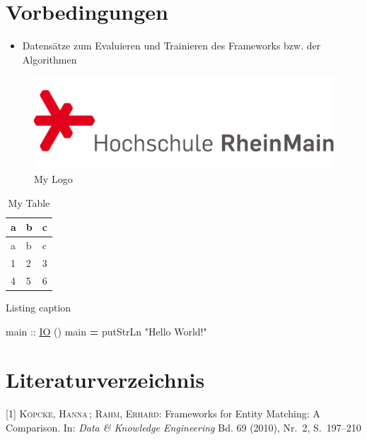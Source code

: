 \documentclass[%
	paper=A4,					%
	twoside=true,				%
	openright,					%
	parskip=full,				%
	chapterprefix=true,			%
	11pt,						%
	headings=normal,			%
	bibliography=totoc,			%
	listof=totoc,				%
	titlepage=on,				%
	captions=tableabove,		%
	draft=false,				%
]{scrreprt}%
\newenvironment{Shaded}{\begin{snugshade}}{\end{snugshade}}
\newcommand{\DataTypeTok}[1]{\textcolor[rgb]{0.74,0.68,0.62}{\underline{{#1}}}}
\newcommand{\StringTok}[1]{\textcolor[rgb]{0.02,0.61,0.04}{{#1}}}
\newcommand{\OtherTok}[1]{\textcolor[rgb]{0.74,0.68,0.62}{{#1}}}
\newcommand{\FunctionTok}[1]{\textcolor[rgb]{1.00,0.58,0.35}{\textbf{{#1}}}}
\newcommand{\NormalTok}[1]{\textcolor[rgb]{0.74,0.68,0.62}{{#1}}}
\providecommand{\tightlist}{%
    \setlength{\itemsep}{0pt}\setlength{\parskip}{0pt}}
\begin{document}
\chapter{Vorbedingungen}\label{vorbedingungen}

\begin{itemize}
\tightlist
\item
  Datensätze zum Evaluieren und Trainieren des Frameworks bzw. der
  Algorithmen
\end{itemize}

\begin{figure}[htbp]
\centering
\includegraphics{./hsrm_logo.png}
\caption{My Logo}\label{fig:label}
\end{figure}

\begin{longtable}[]{@{}lll@{}}
\caption{\label{tbl:label}My Table }\tabularnewline
\toprule
a & b & c\tabularnewline
\midrule
\endfirsthead
\toprule
a & b & c\tabularnewline
\midrule
\endhead
1 & 2 & 3\tabularnewline
4 & 5 & 6\tabularnewline
\bottomrule
\end{longtable}

\begin{codelisting}
\caption{Listing caption}

\hypertarget{lst:code}{\label{lst:code}}
\begin{Shaded}
\begin{Highlighting}[]
\OtherTok{main ::} \DataTypeTok{IO} \NormalTok{()}
\NormalTok{main }\FunctionTok{=} \NormalTok{putStrLn }\StringTok{"Hello World!"}
\end{Highlighting}
\end{Shaded}

\end{codelisting}

\chapter*{Literaturverzeichnis}\label{literaturverzeichnis}

\hypertarget{refs}{}
\hypertarget{ref-kopcke_frameworks_2010}{}
{[}1{]} \textsc{Köpcke, Hanna} ; \textsc{Rahm, Erhard}: Frameworks for
Entity Matching: A Comparison. In: \emph{Data \& Knowledge Engineering}
Bd. 69 (2010), Nr.~2, S.~197--210
\end{document}
